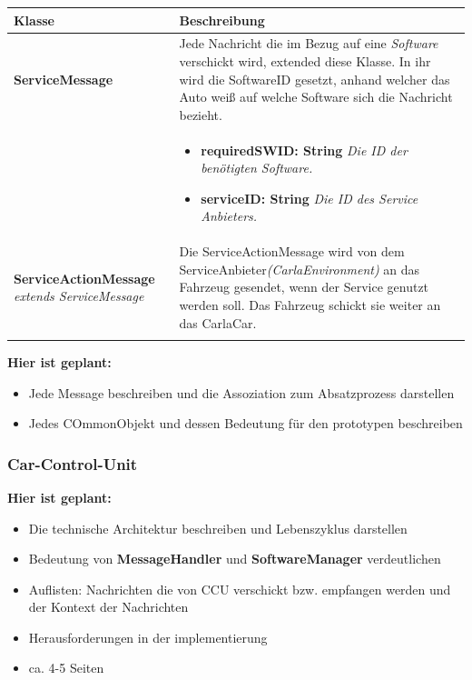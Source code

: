 \begin{center}
	\begin{tabular}{| p{} | p{} |}
		\hline
		\textbf{Klasse} &\textbf{Beschreibung}\\
		\hline
		\textbf{ServiceMessage} &
		Jede Nachricht die im Bezug auf eine \textit{Software} verschickt wird, extended diese Klasse. In ihr wird die SoftwareID gesetzt, anhand welcher das Auto weiß auf welche Software sich die Nachricht bezieht.\\
		&
		\begin{itemize}
			\item[] \textbf{requiredSWID: String} \textit{Die ID der benötigten Software.}
			\item[] \textbf{serviceID: String} \textit{Die ID des Service Anbieters.}
		\end{itemize}\\
		\hline
		\textbf{ServiceActionMessage} \textit{extends ServiceMessage}&Die ServiceActionMessage wird von dem ServiceAnbieter\textit{(CarlaEnvironment)} an das Fahrzeug gesendet, wenn der Service genutzt werden soll. Das Fahrzeug schickt sie weiter an das CarlaCar.\\&\\
		\hline
		
	\end{tabular}
\end{center}

\textbf{Hier ist geplant:}
\begin{itemize}
	\item Jede Message beschreiben und die Assoziation zum Absatzprozess darstellen
	\item Jedes COmmonObjekt und dessen Bedeutung für den prototypen beschreiben
\end{itemize}



\subsubsection{Car-Control-Unit}
\textbf{Hier ist geplant:}
\begin{itemize}
	\item Die technische Architektur beschreiben und Lebenszyklus darstellen
	\item Bedeutung von \textbf{MessageHandler} und \textbf{SoftwareManager} verdeutlichen
	\item Auflisten: Nachrichten die von CCU verschickt bzw. empfangen werden und der Kontext der Nachrichten
	\item Herausforderungen in der implementierung
	\item ca. 4-5 Seiten
\end{itemize}

